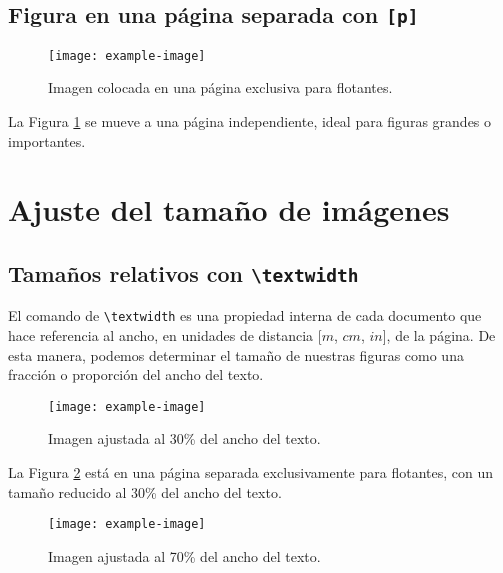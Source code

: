 \documentclass[12pt]{article}
\begin{document}
\lipsum[8]


\subsection{Figura en una página separada con \texttt{[p]}}

\lipsum[8]

\begin{figure}[p] %
    \centering
    \texttt{[image: example-image]}
    \caption{Imagen colocada en una página exclusiva para flotantes.}
    \label{fig:p}
\end{figure}

La Figura \ref{fig:p} se mueve a una página independiente, ideal para figuras grandes o importantes.

\section{Ajuste del tamaño de imágenes}

\lipsum[8]

\subsection{Tamaños relativos con \texttt{\textbackslash textwidth}}

El comando de \texttt{\textbackslash textwidth} es una propiedad interna de cada documento que hace referencia al ancho, en unidades de distancia [$m$, $cm$, $in$], de la página. De esta manera, podemos determinar el tamaño de nuestras figuras como una fracción o proporción del ancho del texto. 

\begin{figure}[p]
    \centering
    \texttt{[image: example-image]}
    \caption{Imagen ajustada al 30\% del ancho del texto.}
    \label{fig:textwidth-30}
\end{figure}


\lipsum[8]

La Figura \ref{fig:textwidth-30} está en una página separada exclusivamente para flotantes, con un tamaño reducido al 30\% del ancho del texto.


\begin{figure}[t]
    \centering
    \texttt{[image: example-image]}
    \caption{Imagen ajustada al 70\% del ancho del texto.}
    \label{fig:textwidth-70}
\end{figure}

\lipsum[8]
\end{document}
